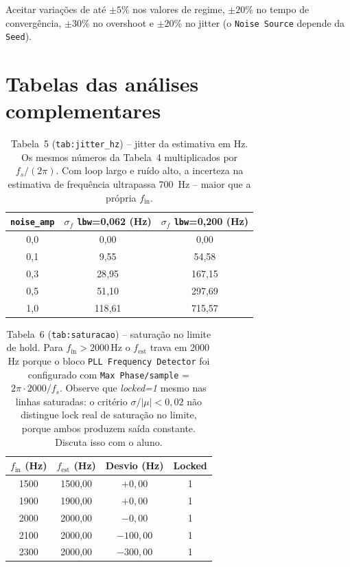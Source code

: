 \documentclass[11pt,a4paper]{article}
\begin{document}
\begin{nota}
Aceitar variações de até $\pm 5\%$ nos valores de regime, $\pm 20\%$
no tempo de convergência, $\pm 30\%$ no overshoot e $\pm 20\%$ no jitter
(o \texttt{Noise Source} depende da \texttt{Seed}).
\end{nota}

\section*{Tabelas das análises complementares}

\begin{table}[H]
  \centering
  \begin{tabular}{c c c}
    \toprule
    \texttt{noise\_amp} & $\sigma_f$ \texttt{lbw}=0{,}062 (Hz) & $\sigma_f$ \texttt{lbw}=0{,}200 (Hz) \\
    \midrule
    0{,}0 & 0{,}00   & 0{,}00   \\
    0{,}1 & 9{,}55   & 54{,}58  \\
    0{,}3 & 28{,}95  & 167{,}15 \\
    0{,}5 & 51{,}10  & 297{,}69 \\
    1{,}0 & 118{,}61 & 715{,}57 \\
    \bottomrule
  \end{tabular}
  \caption{Tabela~5 (\texttt{tab:jitter\_hz}) -- jitter da estimativa em Hz. Os mesmos números da Tabela~4 multiplicados por $f_s/(2\pi)$. Com loop largo e ruído alto, a incerteza na estimativa de frequência ultrapassa 700~Hz -- maior que a própria $f_\text{in}$.}
\end{table}

\begin{table}[H]
  \centering
  \begin{tabular}{c c c c}
    \toprule
    $f_\text{in}$ (Hz) & $f_\text{est}$ (Hz) & Desvio (Hz) & Locked \\
    \midrule
    1500 & 1500{,}00 & $+0{,}00$ & 1 \\
    1900 & 1900{,}00 & $+0{,}00$ & 1 \\
    2000 & 2000{,}00 & $-0{,}00$ & 1 \\
    2100 & 2000{,}00 & $-100{,}00$ & 1 \\
    2300 & 2000{,}00 & $-300{,}00$ & 1 \\
    \bottomrule
  \end{tabular}
  \caption{Tabela~6 (\texttt{tab:saturacao}) -- saturação no limite de hold. Para $f_\text{in} > 2000$\,Hz o $f_\text{est}$ trava em 2000\,Hz porque o bloco \texttt{PLL Frequency Detector} foi configurado com \texttt{Max Phase/sample} = $2\pi \cdot 2000/f_s$. Observe que \emph{locked=1} mesmo nas linhas saturadas: o critério $\sigma/|\mu| < 0{,}02$ não distingue lock real de saturação no limite, porque ambos produzem saída constante. Discuta isso com o aluno.}
\end{table}
\end{document}
